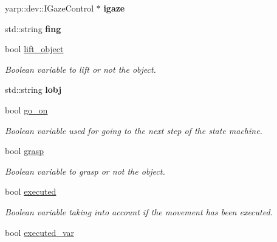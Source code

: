 \begin{DoxyCompactItemize}
\item 
yarp\+::dev\+::\+I\+Gaze\+Control $\ast$ {\bfseries igaze}\label{classGraspingModule_a70a410aead666d7198eb183ba05472a5}

\item 
std\+::string {\bfseries fing}\label{classGraspingModule_ad33afeaa6a6b67f3f49ccb4ee771e6cb}

\item 
bool \hyperlink{classGraspingModule_ae7f23202919c7dbd742230a2cc005043}{lift\+\_\+object}\label{classGraspingModule_ae7f23202919c7dbd742230a2cc005043}

\begin{DoxyCompactList}\small\item\em Boolean variable to lift or not the object. \end{DoxyCompactList}\item 
std\+::string {\bfseries lobj}\label{classGraspingModule_af871b2ab1e5110408893eef5ac711984}

\item 
bool \hyperlink{classGraspingModule_aa1da1c0d76de383f74360bc9c9125e77}{go\+\_\+on}\label{classGraspingModule_aa1da1c0d76de383f74360bc9c9125e77}

\begin{DoxyCompactList}\small\item\em Boolean variable used for going to the next step of the state machine. \end{DoxyCompactList}\item 
bool \hyperlink{classGraspingModule_ae56f0d9a9eed5d68051da744dac15a41}{grasp}\label{classGraspingModule_ae56f0d9a9eed5d68051da744dac15a41}

\begin{DoxyCompactList}\small\item\em Boolean variable to grasp or not the object. \end{DoxyCompactList}\item 
bool \hyperlink{classGraspingModule_a499af38a89686312a34117c0218fc6cb}{executed}\label{classGraspingModule_a499af38a89686312a34117c0218fc6cb}

\begin{DoxyCompactList}\small\item\em Boolean variable taking into account if the movement has been executed. \end{DoxyCompactList}\item 
bool \hyperlink{classGraspingModule_abdcf071d6ce460a83c56ef1ba90f8b1f}{executed\+\_\+var}\label{classGraspingModule_abdcf071d6ce460a83c56ef1ba90f8b1f}


\end{DoxyCompactItemize}
